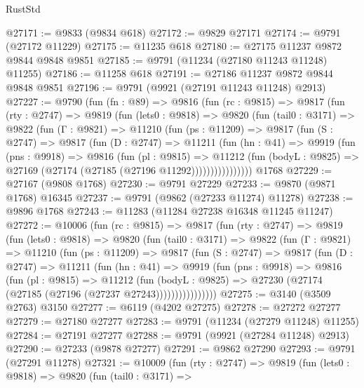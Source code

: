 \begin{lexlean}{RustStd}
\begin{coremodule}
@27171 := @9833 (@9834 @618)
@27172 := @9829 @27171
@27174 := @9791 (@27172 @11229)
@27175 := @11235 @618
@27180 := @27175 @11237 @9872 @9844 @9848 @9851
@27185 := @9791 (@11234 (@27180 @11243 @11248) @11255)
@27186 := @11258 @618
@27191 := @27186 @11237 @9872 @9844 @9848 @9851
@27196 := @9791 (@9921 (@27191 @11243 @11248) @2913)
@27227 := @9790
    (fun (fn : @89) =>
    @9816
      (fun (rc : @9815) =>
      @9817
        (fun (rty : @2747) =>
        @9819
          (fun (lets0 : @9818) =>
          @9820
            (fun (tail0 : @3171) =>
            @9822
              (fun (Γ : @9821) =>
              @11210
                (fun (ps : @11209) =>
                @9817
                  (fun (S : @2747) =>
                  @9817
                    (fun (D : @2747) =>
                    @11211
                      (fun (hn : @41) =>
                      @9919
                        (fun (pns : @9918) =>
                        @9816
                          (fun (pl : @9815) =>
                          @11212
                            (fun (bodyL : @9825) =>
                            @27169 (@27174 (@27185 (@27196 @11292))))))))))))))))
    @1768
@27229 := @27167 (@9808 @1768)
@27230 := @9791 @27229
@27233 := @9870 (@9871 @1768) @16345
@27237 := @9791 (@9862 (@27233 @11274) @11278)
@27238 := @9896 @1768
@27243 := @11283 (@11284 @27238 @16348 @11245 @11247)
@27272 := @10006
    (fun (rc : @9815) =>
    @9817
      (fun (rty : @2747) =>
      @9819
        (fun (lets0 : @9818) =>
        @9820
          (fun (tail0 : @3171) =>
          @9822
            (fun (Γ : @9821) =>
            @11210
              (fun (ps : @11209) =>
              @9817
                (fun (S : @2747) =>
                @9817
                  (fun (D : @2747) =>
                  @11211
                    (fun (hn : @41) =>
                    @9919
                      (fun (pns : @9918) =>
                      @9816
                        (fun (pl : @9815) =>
                        @11212
                          (fun (bodyL : @9825) =>
                          @27230 (@27174 (@27185 (@27196 (@27237 @27243))))))))))))))))
@27275 := @3140 (@3509 @2763) @3150
@27277 := @6119 (@4202 @27275)
@27278 := @27272 @27277
@27279 := @27180 @27277
@27283 := @9791 (@11234 (@27279 @11248) @11255)
@27284 := @27191 @27277
@27288 := @9791 (@9921 (@27284 @11248) @2913)
@27290 := @27233 (@9878 @27277)
@27291 := @9862 @27290
@27293 := @9791 (@27291 @11278)
@27321 := @10009
    (fun (rty : @2747) =>
    @9819
      (fun (lets0 : @9818) =>
      @9820
        (fun (tail0 : @3171) =>

\end{coremodule}
\end{lexlean}

